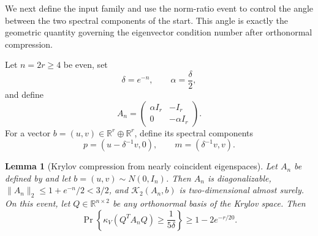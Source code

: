 \documentclass[11pt]{article}
\newtheorem{lemma}{Lemma}[section]
\begin{document}
We next define the input family and use the norm-ratio event to control the
angle between the two spectral components of the start.  This angle is exactly
the geometric quantity governing the eigenvector condition number after
orthonormal compression.

Let $n=2r\geq4$ be even, set
\[
  \delta=e^{-n},\qquad \alpha=\frac{\delta}{2},
\]
and define
\begin{equation}
  A_n=
  \begin{pmatrix}
    \alpha I_r&-I_r\\
    0&-\alpha I_r
  \end{pmatrix}.
  \label{eq:input-family}
\end{equation}
For a vector $b=(u,v)\in\mathbb R^r\oplus\mathbb R^r$, define its spectral
components
\begin{equation}
  p=(u-\delta^{-1}v,0),
  \qquad
  m=(\delta^{-1}v,v).
  \label{eq:spectral-components}
\end{equation}

\begin{lemma}[Krylov compression from nearly coincident eigenspaces]
\label{lem:counterexample-geometry}
Let $A_n$ be defined by  and let
$b=(u,v)\sim N(0,I_n)$.  Then $A_n$ is diagonalizable,
$\lVert A_n\rVert_2\leq1+e^{-n}/2<3/2$, and
$\mathcal K_2(A_n,b)$ is two-dimensional almost surely.  On this event, let
$Q\in\mathbb R^{n\times2}$ be any orthonormal basis of the Krylov space.  Then
\[
  \Pr\!\left\{\kappa_V(Q^TA_nQ)\geq\frac1{5\delta}\right\}
  \geq1-2e^{-r/20}.
\]
\end{lemma}
\end{document}
